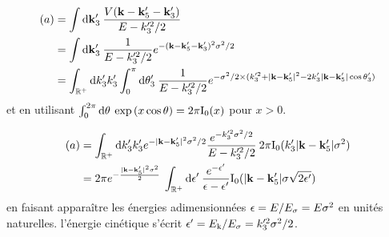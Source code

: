 \begin{align}
(a)&= \int{\mathop{}\mathopen{}\mathrm{d}\mathbf{k}_{\mathrm{3}}' \: \frac{V(\mathbf{k}-\mathbf{k}_{\mathrm{5}}'-\mathbf{k}_{\mathrm{3}}')}{E-k_{\mathrm{3}}'^2/2}} \\
&= \int{\mathop{}\mathopen{}\mathrm{d}\mathbf{k}_{\mathrm{3}}' \: \frac{1}{E-k_{\mathrm{3}}'^2/2} e^{-(\mathbf{k}-\mathbf{k}_{\mathrm{5}}'-\mathbf{k}_{\mathrm{3}}')^2 \sigma^2/2}} \\
&= \int_{\mathbb{R}^+}{\mathop{}\mathopen{}\mathrm{d} k_{\mathrm{3}}' k_{\mathrm{3}}' \int_0^{\pi}{\mathop{}\mathopen{}\mathrm{d}\theta_{\mathrm{3}}'\: \frac{1}{E-k_{\mathrm{3}}'^2/2}e^{-\sigma^2/2\times (k_{\mathrm{3}}'^2+|\mathbf{k}-\mathbf{k}_{\mathrm{5}}'|^2-2k_{\mathrm{3}}' |\mathbf{k}-\mathbf{k}_{\mathrm{5}}'| \cos{\theta_{\mathrm{3}}'})}}}
\end{align}
et en utilisant $\int_0^{2\pi}{\mathop{}\mathopen{}\mathrm{d}\theta\:\exp{(x\cos{\theta})}} =2\pi \mathrm{I_0}(x)$ pour $x>0$.

\begin{align}
(a)&=\int_{\mathbb{R}^+}{\mathop{}\mathopen{}\mathrm{d} k_{\mathrm{3}}' k_{\mathrm{3}}' e^{-|\mathbf{k}-\mathbf{k}_{\mathrm{5}}'|^2 \sigma^2/2} \frac{e^{-k_{\mathrm{3}}'^2\sigma^2/2}}{E-k_{\mathrm{3}}'^2/2} \: 2\pi \mathrm{I_0}(k_{\mathrm{3}}' |\mathbf{k}-\mathbf{k}_{\mathrm{5}}'|\sigma^2)} \\
&= 2\pi e^{-\frac{|\mathbf{k}-\mathbf{k}_{\mathrm{5}}'|^2\sigma^2}{2}} \: \int_{\mathbb{R}^+}{\mathop{}\mathopen{}\mathrm{d}\epsilon'\:\frac{e^{-\epsilon'}}{\epsilon-\epsilon'}\mathrm{I_0}(|\mathbf{k}-\mathbf{k}_{\mathrm{5}}'|\sigma\sqrt{2\epsilon'})}
\end{align}
en faisant apparaître les énergies adimensionnées $\epsilon=E/E_{\sigma}=E\sigma^2$ en unités naturelles. l'énergie cinétique s'écrit $\epsilon'=E_{\mathrm{k}}/E_{\sigma}=k_{\mathrm{3}}'^2\sigma^2/2$.

